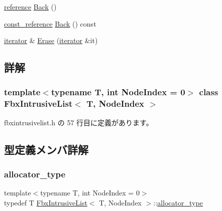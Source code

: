 \begin{DoxyCompactItemize}
\hyperlink{class_fbx_intrusive_list_aa927f048081371fe74dff673d3a5a8ad}{reference} \hyperlink{class_fbx_intrusive_list_a665a77e92b2ff654b2571e1375e7ce25}{Back} ()
\item 
\hyperlink{class_fbx_intrusive_list_a21904cb72c0ccae9d5c0b9f171befeb8}{const\+\_\+reference} \hyperlink{class_fbx_intrusive_list_a80f48fff8dee5d4a6391409a17292c91}{Back} () const
\item 
\hyperlink{class_fbx_intrusive_list_ae1012cd86e3ff0a4a49c982f0d34b4e7}{iterator} \& \hyperlink{class_fbx_intrusive_list_a730189544745e9cb520294375d674b5b}{Erase} (\hyperlink{class_fbx_intrusive_list_ae1012cd86e3ff0a4a49c982f0d34b4e7}{iterator} \&it)
\end{DoxyCompactItemize}


\subsection{詳解}
\subsubsection*{template$<$typename T, int Node\+Index = 0$>$\newline
class Fbx\+Intrusive\+List$<$ T, Node\+Index $>$}



 fbxintrusivelist.\+h の 57 行目に定義があります。



\subsection{型定義メンバ詳解}
\mbox{\label{class_fbx_intrusive_list_a25910b7e87998a2f60ec5762b254bff8}} 
\subsubsection{\texorpdfstring{allocator\+\_\+type}{allocator\_type}}
{\footnotesize\ttfamily template$<$typename T, int Node\+Index = 0$>$ \\
typedef T \hyperlink{class_fbx_intrusive_list}{Fbx\+Intrusive\+List}$<$ T, Node\+Index $>$\+::\hyperlink{class_fbx_intrusive_list_a25910b7e87998a2f60ec5762b254bff8}{allocator\+\_\+type}}



